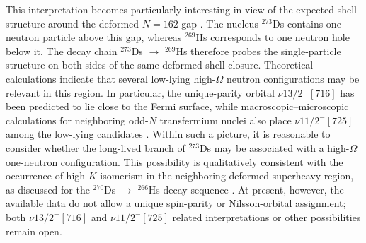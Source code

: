 \documentclass[final,5p,times,twocolumn,number,sort&compress]{elsarticle}
\begin{document}
This interpretation becomes particularly interesting in view of the expected shell structure around the deformed $N=162$ gap \cite{guoStabilizationDeformedSuperheavy2024}. 
The nucleus $^{273}$Ds contains one neutron particle above this gap, whereas $^{269}$Hs corresponds to one neutron hole below it. 
The decay chain $^{273}$Ds $\rightarrow$ $^{269}$Hs therefore probes the single-particle structure on both sides of the same deformed shell closure. 
Theoretical calculations indicate that several low-lying high-$\Omega$ neutron configurations may be relevant in this region. 
In particular, the unique-parity orbital $\nu 13/2^{-}[716]$ has been predicted to lie close to the Fermi surface, while macroscopic--microscopic calculations for neighboring odd-$N$ transfermium nuclei also place $\nu 11/2^{-}[725]$ among the low-lying candidates \cite{Shi2014,Parkhomenko2005}. 
Within such a picture, it is reasonable to consider whether the long-lived branch of $^{273}$Ds may be associated with a high-$\Omega$ one-neutron configuration. 
This possibility is qualitatively consistent with the occurrence of high-$K$ isomerism in the neighboring deformed superheavy region, as discussed for the $^{270}$Ds $\rightarrow$ $^{266}$Hs decay sequence \cite{xuEnhancedStabilitySuperheavy2004}. 
At present, however, the available data do not allow a unique spin-parity or Nilsson-orbital assignment; both $\nu 13/2^{-}[716]$ and $\nu 11/2^{-}[725]$ related interpretations or other possibilities remain open.
\end{document}
